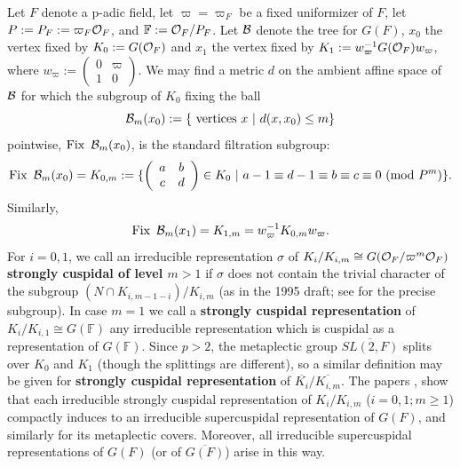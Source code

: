 \documentclass[12pt,letterpaper,openany]{book}
\theoremstyle{plain}
\theoremstyle{definition}
\theoremstyle{remark}
\theoremstyle{remark}
\begin{document}
Let
$F$ denote a p-adic field, let
$\varpi =\varpi_F$ be a fixed uniformizer of $F$, let $P:=P_F:=\varpi_F{\cal{O}}_F$,
and ${\mathbb{F}} :={\cal{O}}_F/P_F$.
Let ${\cal{B}}$ denote the tree for $G(F)$, $x_0$ the vertex fixed by
$K_0:=G({\cal{O}}_F)$ and $x_1$ the vertex fixed by $
K_1:=w_\varpi^{-1}G({\cal{O}}_F)w_\varpi$, where
$w_\varpi:=
\left(\begin{array}{cc}
0&\varpi \\ 1& 0\end{array}\right)$.
We may find a metric $d$ on the ambient affine space of ${\cal{B}}$
for which the subgroup of $K_0$ fixing the ball
\begin{equation}
{\cal{B}}_m(x_0):=\{\text{ vertices }x\ |\ d(x,x_0)\leq m\}
\end{equation}
pointwise, $\operatorname{Fix}\ {\cal{B}}_m(x_0)$, is the standard filtration subgroup:
\begin{equation}
\operatorname{Fix}\ {\cal{B}}_m(x_0)=K_{0,m}:=
\{\left(\begin{array}{cc} a&b \\ c& d\end{array}\right)\in K_0\ |\
a-1\equiv d-1\equiv b\equiv c\equiv 0\  ({\rm mod\ } P^m)\}.
\end{equation}
Similarly,
\begin{equation}
\operatorname{Fix}\ {\cal{B}}_m(x_1)=K_{1,m}=w_\varpi^{-1}K_{0,m}w_\varpi.
\end{equation}
For $i=0,1$, we call an irreducible representation $\sigma$ of
$K_i/K_{i,m}\cong G({\cal{O}}_F/\varpi^m{\cal{O}}_F)$
{\bf strongly cuspidal of level $m>1$} if
$\sigma$ does not contain the trivial character
of the subgroup $(N\cap K_{i,m-1-i})/K_{i,m}$ (as in the 1995 draft; see \cite{M1} for
the precise subgroup). In case $m=1$ we call a
{\bf strongly cuspidal representation} of
$K_i/K_{i,1}\cong G({\mathbb{F}})$
any irreducible representation which is cuspidal as a representation of
$G({\mathbb{F}})$. Since $p> 2$, the metaplectic group
$\overline{SL(2,F)}$ splits over $K_0$ and $K_1$ (though the splittings
are different), so a similar definition may be given for
{\bf strongly cuspidal representation} of
$\overline{K_i}/\overline{K_{i,m}}$. The papers \cite{M1},
\cite{M2} show that each irreducible strongly cuspidal representation
of $K_i/K_{i,m}$ ($i=0,1;m\geq 1$) compactly induces to an irreducible
supercuspidal representation of $G(F)$, and similarly for its metaplectic
covers. Moreover, all irreducible supercuspidal representations
of $G(F)$ (or of $\overline{G(F)}$) arise in this way.
\end{document}
